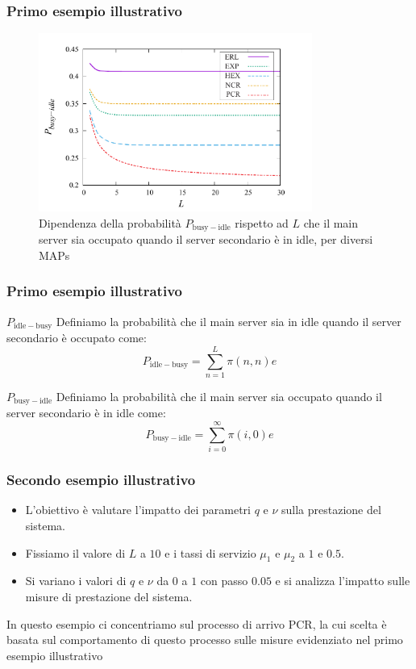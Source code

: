 \documentclass{beamer}
\begin{document}
\begin{frame}
    \frametitle{Primo esempio illustrativo}
    \begin{figure}
        \centering
        \includegraphics[width=0.8\textwidth]{EZp90oP.png}
        \caption{Dipendenza della probabilità $P_{\mathrm{busy-idle}}$ rispetto ad $L$ che il main server sia occupato quando il server secondario è in idle, per diversi MAPs}
        \label{fig:5}
    \end{figure}
\end{frame}


\begin{frame}
    \frametitle{Primo esempio illustrativo}
    \begin{block}{$P_{\mathrm{idle-busy}}$}
        Definiamo la probabilità che il main server sia in idle quando il server secondario è occupato come:
        $$ P_{\mathrm{idle-busy}} = \sum_{n=1}^{L} \pi(n,n) e $$
    \end{block}
    \begin{block}{$P_{\mathrm{busy-idle}}$}
        Definiamo la probabilità che il main server sia occupato quando il server secondario è in idle come:
        $$ P_{\mathrm{busy-idle}} = \sum_{i=0}^{\infty} \pi(i,0) e $$
    \end{block}
\end{frame}


\begin{frame}
    \frametitle{Secondo esempio illustrativo}
    \begin{itemize}
        \item L'obiettivo è valutare l'impatto dei parametri $q$ e $\nu$ sulla prestazione del sistema.
        \item Fissiamo il valore di $L$ a $10$ e i tassi di servizio $\mu_1$ e $\mu_2$ a $1$ e $0.5$.
        \item Si variano i valori di $q$ e $\nu$ da $0$ a $1$ con passo $0.05$ e si analizza l'impatto sulle misure di prestazione del sistema.
    \end{itemize}
    \begin{block}{}
        In questo esempio ci concentriamo sul processo di arrivo PCR, la cui scelta è basata sul comportamento di questo processo sulle misure evidenziato nel primo esempio illustrativo
    \end{block}
\end{frame}
\end{document}
